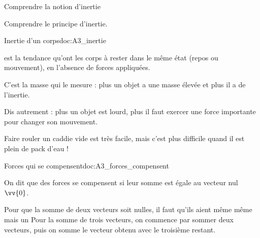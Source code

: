 \teteSndMouv


\vspace*{-32pt}


\begin{objectifs}
  \item Comprendre la notion d'inertie
  \item Comprendre le principe d'inertie.
\end{objectifs}


\begin{doc}{Inertie d'un corps}{doc:A3_inertie}
  \begin{importants}
     est la tendance qu'ont les corps à rester dans le même état (repos ou mouvement), en l'absence de forces appliquées.
  \end{importants}
    
  \fleche C'est la masse qui le mesure : plus un objet a une masse élevée et plus il a de l'inertie.
  
  \fleche Dis autrement : plus un objet est lourd, plus il faut exercer une force importante pour changer son mouvement.
  
  \exemple Faire rouler un caddie vide est très facile, mais c'est plus difficile quand il est plein de pack d'eau !
\end{doc}


\begin{doc}{Forces qui se compensent}{doc:A3_forces_compensent}
  \begin{importants} 
    On dit que des forces se compensent si leur somme est égale au vecteur nul $\vv{0}$.
  \end{importants}
  Pour que la somme de deux vecteurs soit nulles, il faut qu'ils aient même  même  mais un 
  Pour la somme de trois vecteurs, on commence par sommer deux vecteurs, puis on somme le vecteur obtenu avec le troisième restant.
  
  \centering
\end{doc}





